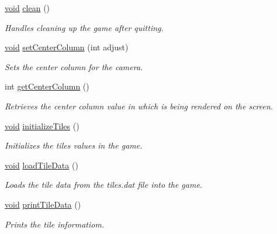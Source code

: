 \begin{DoxyCompactItemize}
\mbox{\hyperlink{_s_d_l__opengles2__gl2ext_8h_ae5d8fa23ad07c48bb609509eae494c95}{void}} \mbox{\hyperlink{class_game_ad4f36a72a2d06696f7973788606f57fc}{clean}} ()
\begin{DoxyCompactList}\small\item\em Handles cleaning up the game after quitting. \end{DoxyCompactList}\item 
\mbox{\hyperlink{_s_d_l__opengles2__gl2ext_8h_ae5d8fa23ad07c48bb609509eae494c95}{void}} \mbox{\hyperlink{class_game_a0ecd12967520b3fa575420d6db016b75}{set\+Center\+Column}} (int adjust)
\begin{DoxyCompactList}\small\item\em Sets the center column for the camera. \end{DoxyCompactList}\item 
int \mbox{\hyperlink{class_game_a8329ab00bbf109137c04a2e9b3d4d483}{get\+Center\+Column}} ()
\begin{DoxyCompactList}\small\item\em Retrieves the center column value in which is being rendered on the screen. \end{DoxyCompactList}\item 
\mbox{\hyperlink{_s_d_l__opengles2__gl2ext_8h_ae5d8fa23ad07c48bb609509eae494c95}{void}} \mbox{\hyperlink{class_game_af40023a23183414d0d15535b9b239c11}{initialize\+Tiles}} ()
\begin{DoxyCompactList}\small\item\em Initializes the tiles values in the game. \end{DoxyCompactList}\item 
\mbox{\hyperlink{_s_d_l__opengles2__gl2ext_8h_ae5d8fa23ad07c48bb609509eae494c95}{void}} \mbox{\hyperlink{class_game_a86c008fa563e8dd80dab8b35305109a2}{load\+Tile\+Data}} ()
\begin{DoxyCompactList}\small\item\em Loads the tile data from the tiles.\+dat file into the game. \end{DoxyCompactList}\item 
\mbox{\hyperlink{_s_d_l__opengles2__gl2ext_8h_ae5d8fa23ad07c48bb609509eae494c95}{void}} \mbox{\hyperlink{class_game_a07319c02e980c2ec153312d18061b566}{print\+Tile\+Data}} ()
\begin{DoxyCompactList}\small\item\em Prints the tile informatiom. \end{DoxyCompactList}\item 

\end{DoxyCompactItemize}

